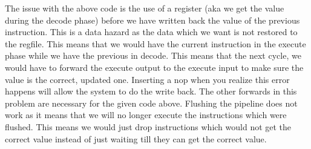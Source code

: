 \begin{blocksection}

\begin{solution}[0.5in]
The issue with the above code is the use of a register (aka we get the value during the decode phase) before
we have written back the value of the previous instruction. This is a data hazard as the data which we want is
not restored to the regfile. This means that we would have the current instruction in the execute phase while
we have the previous in decode. This means that the next cycle, we would have to forward the execute output
to the execute input to make sure the value is the correct, updated one. Inserting a nop when you realize this
error happens will allow the system to do the write back. The other forwards in this problem are necessary for
the given code above. Flushing the pipeline does not work as it means that we will no longer execute the
instructions which were flushed. This means we would just drop instructions which would not get the correct
value instead of just waiting till they can get the correct value.
\end{solution}


\end{blocksection}